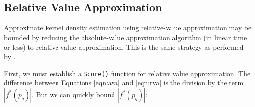 %
%
%


\subsection{Relative Value Approximation}

Approximate kernel density estimation using relative-value approximation may be
bounded by reducing the absolute-value approximation algorithm (in linear time
or less) to relative-value approximation.  This is the same strategy as
performed by \citet{ram2009}.

First, we must establish a \texttt{Score()} function for relative value
approximation.  The difference between Equations \ref{eqn:ava} and \ref{eqn:rva}
is the division by the term $|f^*(p_q)|$.  But we can quickly bound
$|f^*(p_q)|$:

